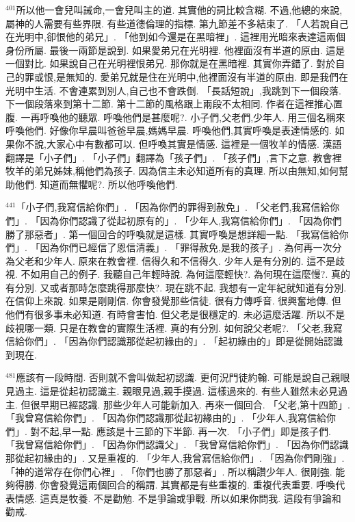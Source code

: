\documentclass{book}
\begin{document}
$^{401}$所以他一會兒叫誡命,一會兒叫主的道.
其實他的詞比較含糊.
不過,他總的來說,屬神的人需要有些界限.
有些道德倫理的指標.
第九節差不多結束了.
「人若說自己在光明中,卻恨他的弟兄」.
「他到如今還是在黑暗裡」.
這裡用光暗來表達這兩個身份所屬.
最後一兩節是說到.
如果愛弟兄在光明裡.
他裡面沒有半道的原由.
這是一個對比.
如果說自己在光明裡恨弟兄.
那你就是在黑暗裡.
其實你弄錯了.
對於自己的罪或恨,是無知的.
愛弟兄就是住在光明中,他裡面沒有半道的原由.
即是我們在光明中生活.
不會連累到別人,自己也不會跌倒.
「長話短說」,我跳到下一個段落.
下一個段落來到第十二節.
第十二節的風格跟上兩段不太相同.
作者在這裡推心置腹.
一再呼喚他的聽眾.
呼喚他們是甚麼呢?.
小子們,父老們,少年人.
用三個名稱來呼喚他們.
好像你早晨叫爸爸早晨,媽媽早晨.
呼喚他們,其實呼喚是表達情感的.
如果你不說,大家心中有數都可以.
但呼喚其實是情感.
這裡是一個牧羊的情感.
漢語翻譯是「小子們」.
「小子們」翻譯為「孩子們」.
「孩子們」,言下之意.
教會裡牧羊的弟兄姊妹,稱他們為孩子.
因為信主未必知道所有的真理.
所以由無知,如何幫助他們.
知道而無懼呢?.
所以他呼喚他們.

$^{441}$「小子們,我寫信給你們」.
「因為你們的罪得到赦免」.
「父老們,我寫信給你們」.
「因為你們認識了從起初原有的」.
「少年人,我寫信給你們」.
「因為你們勝了那惡者」.
第一個回合的呼喚就是這樣.
其實呼喚是想詳細一點.
「我寫信給你們」.
「因為你們已經信了恩信清義」.
「罪得赦免,是我的孩子」.
為何再一次分為父老和少年人.
原來在教會裡.
信得久和不信得久.
少年人是有分別的.
這不是歧視.
不如用自己的例子.
我聽自己年輕時說.
為何這麼輕快?.
為何現在這麼慢?.
真的有分別.
又或者那時怎麼跳得那麼快?.
現在跳不起.
我想有一定年紀就知道有分別.
在信仰上來說.
如果是剛剛信.
你會發覺那些信徒.
很有力傳呼音.
很興奮地傳.
但他們有很多事未必知道.
有時會害怕.
但父老是很穩定的.
未必這麼活躍.
所以不是歧視哪一類.
只是在教會的實際生活裡.
真的有分別.
如何說父老呢?.
「父老,我寫信給你們」.
「因為你們認識那從起初緣由的」.
「起初緣由的」即是從開始認識到現在.

$^{481}$應該有一段時間.
否則就不會叫做起初認識.
更何況門徒約翰.
可能是說自己親眼見過主.
這是從起初認識主.
親眼見過,親手摸過.
這樣過來的.
有些人雖然未必見過主.
但很早期已經認識.
那些少年人可能新加入.
再來一個回合.
「父老,第十四節」.
「我曾寫信給你們」.
「因為你們認識那從起初緣由的」.
「少年人,我寫信給你們」.
對不起,早一點.
應該是十三節的下半節.
再一次.
「小子們」即是孩子們.
「我曾寫信給你們」.
「因為你們認識父」.
「我曾寫信給你們」.
「因為你們認識那從起初緣由的」.
又是重複的.
「少年人,我曾寫信給你們」.
「因為你們剛強」.
「神的道常存在你們心裡」.
「你們也勝了那惡者」.
所以稱讚少年人.
很剛強.
能夠得勝.
你會發覺這兩個回合的稱謂.
其實都是有些重複的.
重複代表重要.
呼喚代表情感.
這真是牧養.
不是勸勉.
不是爭論或爭戰.
所以如果你問我.
這段有爭論和勸戒.
\end{document}
